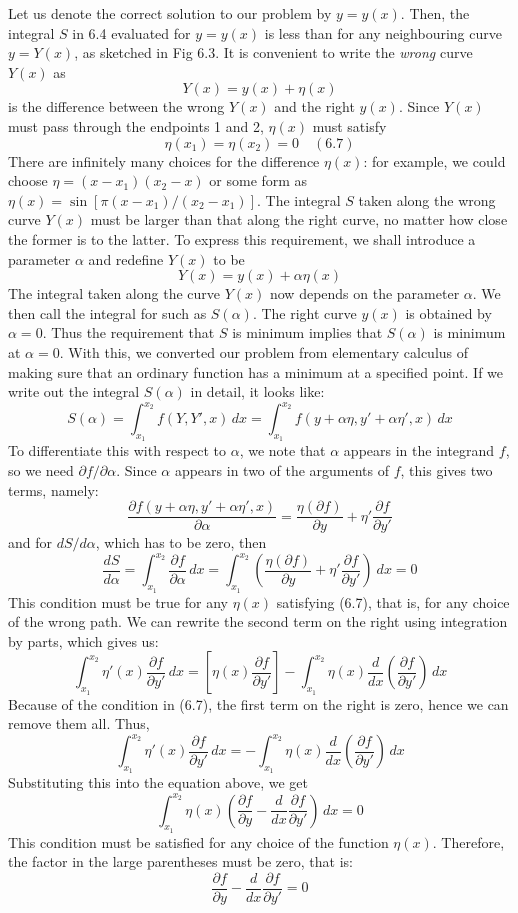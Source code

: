 Let us denote the correct solution to our problem by $y=y(x)$. Then, the integral $S$ in 6.4 evaluated for $y=y(x)$ is less than for any neighbouring curve $y=Y(x)$, as sketched in Fig 6.3. It is convenient to write the \textit{wrong} curve $Y(x)$ as $$Y(x)=y(x)+\eta(x)$$
is the difference between the wrong $Y(x)$ and the right $y(x)$. Since $Y(x)$ must pass through the endpoints 1 and 2, $\eta(x)$ must satisfy $$\eta(x_{1})=\eta(x_{2})=0\quad (6.7)$$
There are infinitely many choices for the difference $\eta(x)$: for example, we could choose $\eta=(x-x_{1})(x_{2}-x)$ or some form as $\eta(x)=\sin{[\pi(x-x_{1})/(x_{2}-x_{1})]}$. The integral $S$ taken along the wrong curve $Y(x)$ must be larger than that along the right curve, no matter how close the former is to the latter. To express this requirement, we shall introduce a parameter $\alpha$ and redefine $Y(x)$ to be $$Y(x)=y(x)+\alpha \eta(x)$$
The integral taken along the curve $Y(x)$ now depends on the parameter $\alpha$. We then call the integral for such as $S(\alpha)$. The right curve $y(x)$ is obtained by $\alpha=0$. Thus the requirement that $S$ is minimum implies that $S(\alpha)$ is minimum at $\alpha=0$. With this, we converted our problem from elementary calculus of making sure that an ordinary function has a minimum at a specified point. If we write out the integral $S(\alpha)$ in detail, it looks like: $$S(\alpha)=\int _{x_{1}}^{x_{2}} f(Y,Y',x) \, dx = \int _{x_{1}}^{x_{2}} f(y+\alpha \eta, y'+\alpha \eta', x) \, dx  $$
To differentiate this with respect to $\alpha$, we note that $\alpha$ appears in the integrand $f$, so we need $\partial f/\partial \alpha$. Since $\alpha$ appears in two of the arguments of $f$, this gives two terms, namely: $$\frac{\partial f(y+\alpha \eta,y'+\alpha \eta',x)}{\partial \alpha}=\frac{\eta (\partial f)}{\partial y}+ \eta' \frac{\partial f}{\partial y'}$$
and for $dS/d\alpha$, which has to be zero, then $$\frac{dS}{d\alpha}=\int _{x_{1}}^{x_{2}} \frac{\partial f}{\partial \alpha} \, dx = \int _{x_{1}}^{x_{2}} \left( \frac{\eta (\partial f)}{\partial y} + \eta' \frac{\partial f}{\partial y'} \right)\: dx = 0$$
This condition must be true for any $\eta(x)$ satisfying (6.7), that is, for any choice of the wrong path. We can rewrite the second term on the right using integration by parts, which gives us: $$\int _{x_{1}}^{x_{2}} \eta'(x) \frac{\partial f}{\partial y'} \, dx = \left[ \eta(x) \frac{\partial f}{\partial y'} \right] - \int _{x_{1}}^{x_{2}}\eta(x) \frac{d}{dx}\left( \frac{\partial f}{\partial y'} \right) \, dx $$
Because of the condition in (6.7), the first term on the right is zero, hence we can remove them all. Thus, $$\int _{x_{1}}^{x_{2}} \eta'(x) \frac{\partial f}{\partial y'} \, dx =  - \int _{x_{1}}^{x_{2}}\eta(x) \frac{d}{dx}\left( \frac{\partial f}{\partial y'} \right) \, dx $$
Substituting this into the equation above, we get $$\int _{x_{1}}^{x_{2}} \eta(x) \left( \frac{\partial f}{\partial y} - \frac{d}{dx} \frac{\partial f}{\partial y'} \right) \, dx = 0 $$
This condition must be satisfied for any choice of the function $\eta(x)$. Therefore, the factor in the large parentheses must be zero, that is: $$\frac{\partial f}{\partial y}- \frac{d}{dx} \frac{\partial f}{\partial y'} = 0$$

